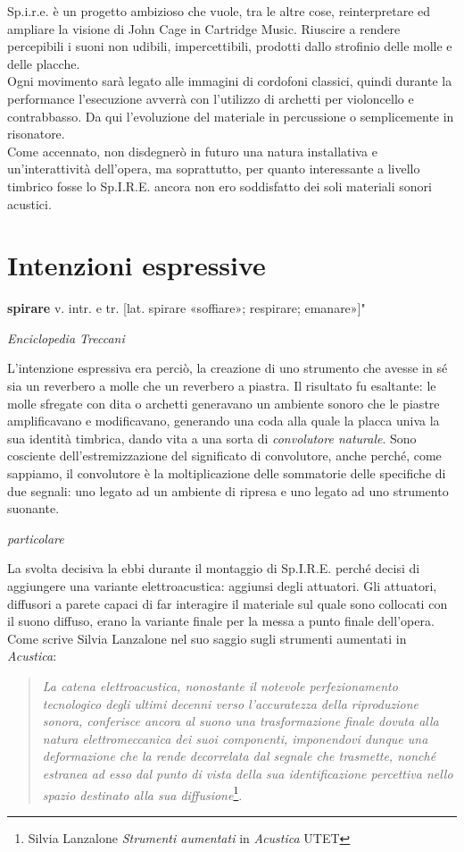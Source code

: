 Sp.i.r.e. è un progetto ambizioso che vuole, tra le altre cose, reinterpretare ed ampliare la visione di John Cage in Cartridge Music. Riuscire a rendere percepibili i suoni non udibili,  impercettibili, prodotti dallo strofinio delle molle e delle placche. \\
Ogni movimento sarà legato alle immagini di cordofoni classici, quindi durante la performance l'esecuzione avverrà con l'utilizzo di archetti per violoncello e contrabbasso. Da qui l'evoluzione del materiale in percussione o semplicemente in risonatore. \\
Come accennato, non disdegnerò in futuro una natura installativa e un'interattività dell'opera, ma soprattutto, per quanto interessante a livello timbrico fosse lo Sp.I.R.E. ancora non ero soddisfatto dei soli materiali sonori acustici. \\

\section{Intenzioni espressive}
\epigraph{\textbf{spirare} v. intr. e tr. [lat. spirare «soffiare»; respirare; emanare»]"}
{\textit{Enciclopedia Treccani}}

L'intenzione espressiva era perciò, la creazione di uno strumento che avesse in sé sia un reverbero a molle che un reverbero a piastra. Il risultato fu esaltante: le molle sfregate con dita o archetti generavano un ambiente sonoro che le piastre amplificavano e modificavano, generando una coda alla quale la placca univa la sua identità timbrica, dando vita a una sorta di \textit{convolutore naturale}. Sono cosciente dell'estremizzazione del significato di convolutore, anche perché, come sappiamo, il convolutore è la moltiplicazione delle sommatorie delle specifiche di due segnali: uno legato ad un ambiente di ripresa e uno legato ad uno strumento suonante. \\
\begin{floatingfigure}{10cm}
\mbox{}
\small{\caption{\textit{particolare}}}
\end{floatingfigure}
La svolta decisiva la ebbi durante il montaggio di Sp.I.R.E. perché decisi di aggiungere una variante elettroacustica: aggiunsi degli attuatori. Gli attuatori, diffusori a parete capaci di far interagire il materiale sul quale sono collocati con il suono diffuso, erano la variante finale per la messa a punto finale dell'opera.
Come scrive Silvia Lanzalone nel suo saggio sugli strumenti aumentati in \textit{Acustica}:
\begin{quotation}
\textit{La catena elettroacustica, nonostante il notevole perfezionamento tecnologico degli ultimi decenni verso l'accuratezza della riproduzione sonora, conferisce ancora al suono una trasformazione finale dovuta alla natura elettromeccanica dei suoi componenti, imponendovi dunque una deformazione che la rende decorrelata dal segnale che trasmette, nonché estranea ad esso dal punto di vista della sua identificazione percettiva nello spazio destinato alla sua diffusione}\footnote{Silvia Lanzalone \textit{Strumenti aumentati} in \textit{Acustica} UTET}.
\end{quotation}

